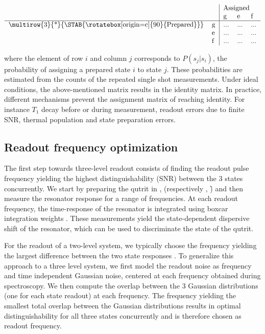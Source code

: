 \begin{table}[H]
\centering
\begin{equation}     \label{eq:state_assignment_probability_matrix}
\begin{tabular}{ll|lll}
 &  & \multicolumn{3}{l}{Assigned} \\
 &  & g & e & f \\ \hline
\multirow{3}{*}{\STAB{\rotatebox[origin=c]{90}{Prepared}}} & g & ... & ... & ... \\
 & e & ... & ... & ... \\
 & f & ... & ... & ...
\end{tabular}
\end{equation}
\end{table} 
\noindent where the element of row $i$ and column $j$ corresponds to $P(s_j|s_i)$, the probability of assigning a prepared state $i$ to state $j$. These probabilities are estimated from the counts of the repeated single shot measurements.
Under ideal conditions, the above-mentioned matrix results in the identity matrix. In practice, different mechanisms prevent the assignment matrix of reaching identity. For instance $T_1$ decay before or during measurement, readout errors due to finite SNR, thermal population and state preparation errors.

\subsection{Readout frequency optimization}
The first step towards three-level readout consists of finding the readout pulse frequency yielding the highest distinguishability (SNR) between the 3 states concurrently. We start by preparing the qutrit in \g, (respectively \e, \f) and then measure the resonator response for a range of frequencies. At each readout frequency, the time-response of the resonator is integrated using boxcar integration weights \cite{Gambetta2007}. These measurements yield the state-dependent dispersive shift of the resonator, which can be used to discriminate the state of the qutrit.

For the readout of a two-level system, we typically choose the frequency yielding the largest difference between the two state responses \cite{Heinsoo2018}. To generalize this approach to a three level system, we first model the readout noise as frequency and time independent Gaussian noise, centered at each frequency obtained during spectroscopy. We then compute the overlap between the 3 Gaussian distributions (one for each state readout) at each frequency. The frequency yielding the smallest total overlap between the Gaussian distributions results in optimal distinguishability for all three states concurrently and is therefore chosen as readout frequency. 

